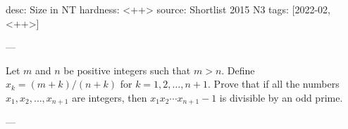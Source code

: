 desc: Size in NT
hardness: <++>
source: Shortlist 2015 N3
tags: [2022-02, <++>]

---

Let $m$ and $n$ be positive integers such that $m > n$. Define $x_k =
(m+k)/(n+k)$ for $k = 1,2,\dots,n+1$. Prove that if all the numbers
$x_1, x_2, \dots, x_{n+1}$ are integers, then $x_1 x_2 \cdots x_{n+1} -
1$ is divisible by an odd prime.

---


